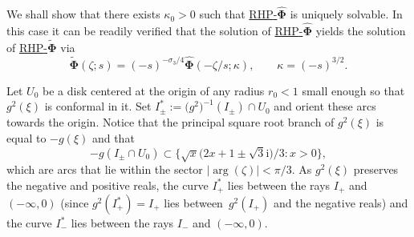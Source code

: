 \documentclass[10pt,a4paper]{amsart}
\numberwithin{equation}{section}
\renewcommand{\arg}{\operatorname{arg}}
\newcommand{\ic}{\mathrm{i}}
\newcommand{\rhwphi} {\textnormal{RHP}-${\widetilde{\boldsymbol \Phi}}$}
\newcommand{\rhhphi} {\textnormal{RHP}-${\widehat{\boldsymbol \Phi}}$}
\begin{document}
We shall show that there exists $ \kappa_0 >0 $ such that \hyperref[rhhphi]{\rhhphi} is uniquely solvable. In this case it can be readily verified that the solution of \hyperref[rhhphi]{\rhhphi} yields the solution of \hyperref[rhwphi]{\rhwphi} via
\[
\widetilde{\boldsymbol\Phi}(\zeta;s) = (-s)^{-\sigma_3/4}\widehat{\boldsymbol\Phi}(-\zeta/s;\kappa), \qquad \kappa = (-s)^{3/2}.
\]

Let $ U_0 $ be a disk centered at the origin of any radius $ r_0<1 $ small enough so that $ g^2(\xi) $ is conformal in it. Set $ I_\pm^* := \bigl(g^2\bigr)^{-1}(I_\pm)\cap U_0 $ and orient these arcs towards the origin. Notice that the principal square root branch of $ g^2(\xi) $ is equal to $ -g(\xi) $ and that
\[
-g(I_\pm\cap U_0) \subset \bigl\{ \sqrt x\bigl(2x+1 \pm \sqrt 3\ic\bigr)/3 : x>0\bigr\},
\]
which are arcs that lie within the sector $ |\arg(\zeta)|<\pi/3 $. As $ g^2(\xi) $ preserves the negative and positive reals, the curve $ I_+^* $ lies between the rays $ I_+ $ and $ (-\infty,0) $ (since $ g^2(I_+^*) = I_+ $ lies between~$ g^2(I_+) $ and the negative reals) and the curve $ I_-^* $ lies between the rays $ I_- $ and $ (-\infty,0) $.
\end{document}
